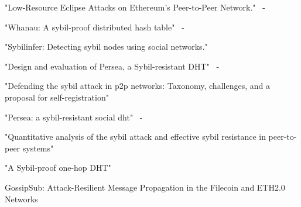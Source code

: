 
"Low-Resource Eclipse Attacks on Ethereum's Peer-to-Peer Network."~\cite{marcus2018low} - 


"Whanau: A sybil-proof distributed hash table"~\cite{lesniewski2010whanau} - 

"Sybilinfer: Detecting sybil nodes using social networks."~\cite{danezis2009sybilinfer}

"Design and evaluation of Persea, a Sybil-resistant DHT"~\cite{al2014design} - 

"Defending the sybil attack in p2p networks: Taxonomy, challenges, and a proposal for self-registration"~\cite{dinger2006defending}

"Persea: a sybil-resistant social dht"~\cite{al2013persea} - 

"Quantitative analysis of the sybil attack and effective sybil resistance in peer-to-peer systems"~\cite{jetter2010quantitative}

"A Sybil-proof one-hop DHT"~\cite{lesniewski2008sybil}


GossipSub: Attack-Resilient Message Propagation in
the Filecoin and ETH2.0 Networks
